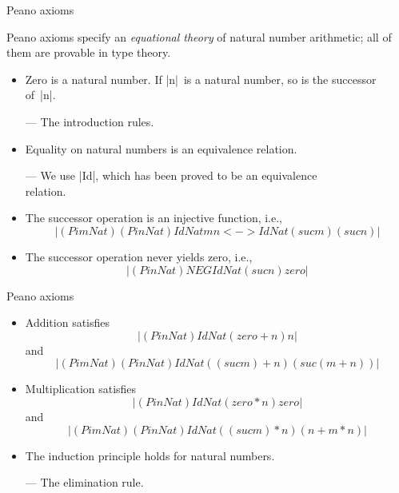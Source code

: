 \documentclass[t,compress,hyperref={hidelinks}]{beamer}
\begin{document}
\begin{frame}{Peano axioms}

Peano axioms specify an \emph{equational theory} of natural number arithmetic; all of them are provable in type theory.

\begin{itemize}

\item Zero is a natural number. If |n|~is a natural number, so is the successor of~|n|.

\quad --- The introduction rules.

\item Equality on natural numbers is an equivalence relation.

\quad --- We use |Id|, which has been proved to be an equivalence\\
\quad\phantom{---} relation.

\item The successor operation is an injective function, i.e.,
\[ |(Pi m Nat) (Pi n Nat) Id Nat m n <-> Id Nat (suc m) (suc n)| \]

\item The successor operation never yields zero, i.e.,
\[ |(Pi n Nat) NEG Id Nat (suc n) zero| \]

\end{itemize}

\end{frame}

\begin{frame}{Peano axioms}

\begin{itemize}

\item Addition satisfies
\[ |(Pi n Nat) Id Nat (zero + n) n| \]
and
\[ |(Pi m Nat) (Pi n Nat) Id Nat ((suc m) + n) (suc (m + n))| \]

\item Multiplication satisfies
\[ |(Pi n Nat) Id Nat (zero * n) zero| \]
and
\[ |(Pi m Nat) (Pi n Nat) Id Nat ((suc m) * n) (n + m * n)| \]

\item The induction principle holds for natural numbers.

\quad --- The elimination rule.

\end{itemize}

\end{frame}
\end{document}
